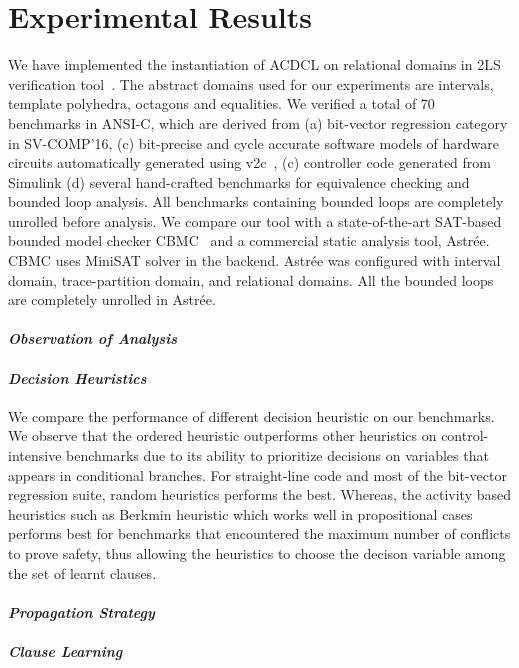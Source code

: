 \section{Experimental Results}
We have implemented the instantiation of ACDCL on relational domains 
in 2LS verification tool~\cite{2ls}.  The abstract domains used for 
our experiments are intervals, template polyhedra, octagons and equalities.  
We verified a total of 70 benchmarks in ANSI-C, which are derived from 
(a) bit-vector regression category in SV-COMP'16, (c) bit-precise and 
cycle accurate software models of hardware circuits automatically 
generated using v2c~\cite{mtk2016}, (c) controller code generated 
from Simulink (d) several hand-crafted benchmarks for equivalence 
checking and bounded loop analysis.  All benchmarks containing 
bounded loops are completely unrolled before analysis.  We compare 
our tool with a state-of-the-art SAT-based bounded model checker 
CBMC~\cite{cbmc} and a commercial static analysis tool, Astr{\'e}e.  
CBMC uses MiniSAT solver in the backend.  Astr{\'e}e was configured with 
interval domain, trace-partition domain, and relational domains.  
All the bounded loops are completely unrolled in Astr{\'e}e.   

\paragraph {\em \textbf{Observation of Analysis}}

\paragraph {\em \textbf{Decision Heuristics}} We compare the performance of 
different decision heuristic on our benchmarks.  We observe that 
the ordered heuristic outperforms other heuristics on control-intensive 
benchmarks due to its ability to prioritize decisions on variables that 
appears in conditional branches.  For straight-line code and most of 
the bit-vector regression suite, random heuristics performs the best.  
Whereas, the activity based heuristics such as Berkmin heuristic which 
works well in propositional cases performs best for benchmarks that 
encountered the maximum number of conflicts to prove safety, thus allowing 
the heuristics to choose the decison variable among the set of learnt clauses.   

\paragraph {\em \textbf{Propagation Strategy}}      

\paragraph {\em \textbf{Clause Learning}}      

  

